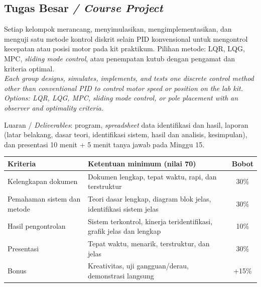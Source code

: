 \documentclass[11pt,a4paper]{article}
\newcommand{\en}[1]{{\color{black!60}\textit{#1}}}
\newcommand{\bsubsection}[2]{\Needspace{8\baselineskip}\subsection[#1 / #2]{#1 \en{/ #2}}}
\begin{document}
\bsubsection{Tugas Besar}{Course Project}
Setiap kelompok merancang, menyimulasikan, mengimplementasikan, dan menguji satu metode kontrol diskrit selain PID konvensional untuk mengontrol kecepatan atau posisi motor pada kit praktikum. Pilihan metode: LQR, LQG, MPC, \textit{sliding mode control}, atau penempatan kutub dengan pengamat dan kriteria optimal.\\
\en{Each group designs, simulates, implements, and tests one discrete control method other than conventional PID to control motor speed or position on the lab kit. Options: LQR, LQG, MPC, sliding mode control, or pole placement with an observer and optimality criteria.}

\medskip
\noindent Luaran / \en{Deliverables}: program, \textit{spreadsheet} data identifikasi dan hasil, laporan (latar belakang, dasar teori, identifikasi sistem, hasil dan analisis, kesimpulan), dan presentasi 10 menit + 5 menit tanya jawab pada Minggu 15.

\begin{table}[H]
	\centering
	\begin{tabularx}{\textwidth}{@{}l Y c@{}}
		\toprule
		\textbf{Kriteria} & \textbf{Ketentuan minimum (nilai 70)} & \textbf{Bobot} \\
		\midrule
		Kelengkapan dokumen & Dokumen lengkap, tepat waktu, rapi, dan terstruktur & 30\% \\
		Pemahaman sistem dan metode & Teori dasar lengkap, diagram blok jelas, identifikasi sistem jelas & 30\% \\
		Hasil pengontrolan & Sistem terkontrol, kinerja teridentifikasi, grafik jelas dan lengkap & 10\% \\
		Presentasi & Tepat waktu, menarik, terstruktur, dan jelas & 30\% \\
		Bonus & Kreativitas, uji gangguan/derau, demonstrasi langsung & +15\% \\
		\bottomrule
	\end{tabularx}
\end{table}
\end{document}
